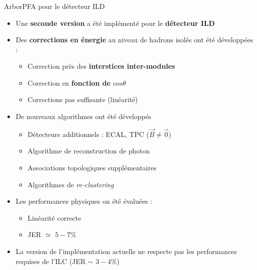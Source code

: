 \documentclass[8pt]{beamer}
\begin{document}
  \begin{frame}
  \frametitle{\secname}
  \framesubtitle{\subsecname}
    \begin{block}{ArborPFA pour le détecteur ILD}
      \begin{itemize}
        \pause
        \item Une \textbf{seconde version} a été implémenté pour le \textbf{détecteur ILD}
        \pause
        \item Des \textbf{corrections en énergie} au niveau de hadrons isolés ont été développées :
        \begin{itemize}
          \item Correction près des \textbf{interstices inter-modules}
          \item Correction en \textbf{fonction de $cos\theta$}
          \item Corrections pas suffisante (linéarité)
        \end{itemize}
        \pause
        \item De nouveaux algorithmes ont été développés
        \begin{itemize}
          \item Détecteurs additionnels : ECAL, TPC ($\vec{B} \neq \vec{0}$)
          \item Algorithme de reconstruction de photon
          \item Associations topologiques supplémentaires
          \item Algorithmes de \textit{re-clustering}
        \end{itemize}
        \pause
        \item Les performances physiques on été évaluées :
        \begin{itemize}
          \item Linéarité correcte
          \item JER $\simeq$ $5-7\%$
        \end{itemize}
        \pause
        \item La version de l'implémentation actuelle ne respecte pas les performances requises de l'ILC (JER $\sim$ $3-4\%$)
      \end{itemize}
    \end{block}
  \end{frame}
\end{document}
